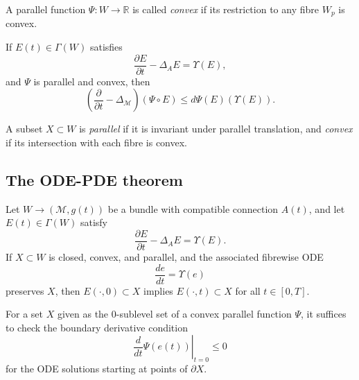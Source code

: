 \begin{definition}
\label{topping-ch9-convex-parallel-function}
A parallel function \(\Psi:W\to\mathbb R\) is called \emph{convex} if its
restriction to any fibre \(W_p\) is convex.
\end{definition}

\begin{proposition}
\label{topping-ch9-parallel-composition-parabolic}
If \(E(t)\in\Gamma(W)\) satisfies
\[
\frac{\partial E}{\partial t}-\Delta_AE=\Upsilon(E),
\]
and \(\Psi\) is parallel and convex, then
\[
\left(\frac{\partial}{\partial t}-\Delta_{\mathcal M}\right)(\Psi\circ E)
\le d\Psi(E)\!\left(\Upsilon(E)\right).
\]
\end{proposition}

\begin{definition}
\label{topping-ch9-parallel-convex-subset}
A subset \(X\subset W\) is \emph{parallel} if it is invariant under parallel
translation, and \emph{convex} if its intersection with each fibre is convex.
\end{definition}

\subsection{The ODE-PDE theorem}

\begin{theorem}
\label{topping-ch9-ode-pde-theorem}
Let \(W\to(\mathcal M,g(t))\) be a bundle with compatible connection \(A(t)\),
and let \(E(t)\in\Gamma(W)\) satisfy
\[
\frac{\partial E}{\partial t}-\Delta_AE=\Upsilon(E).
\]
If \(X\subset W\) is closed, convex, and parallel, and the associated fibrewise
ODE
\[
\frac{de}{dt}=\Upsilon(e)
\]
preserves \(X\), then \(E(\cdot,0)\subset X\) implies \(E(\cdot,t)\subset X\) for
all \(t\in[0,T]\).
\end{theorem}

\begin{remark}
\label{topping-ch9-ode-pde-boundary-test}
For a set \(X\) given as the \(0\)-sublevel set of a convex parallel function
\(\Psi\), it suffices to check the boundary derivative condition
\[
\left.\frac{d}{dt}\Psi(e(t))\right|_{t=0}\le 0
\]
for the ODE solutions starting at points of \(\partial X\).
\end{remark}

